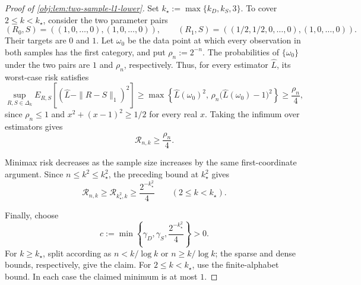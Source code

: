 \begin{proof}[Proof of \cref{obj:lem:two-sample-l1-lower}]
Set \(k_\star:=\max\{k_D,k_S,3\}\). To cover \(2\leq k<k_\star\), consider the two parameter pairs
\[
(R_0,S)=((1,0,\ldots,0),(1,0,\ldots,0)),
\qquad
(R_1,S)=((1/2,1/2,0,\ldots,0),(1,0,\ldots,0)).
\]
Their targets are \(0\) and \(1\). Let \(\omega_0\) be the data point at which every observation in both samples has the first category, and put \(\rho_n:=2^{-n}\). The probabilities of \(\{\omega_0\}\) under the two pairs are \(1\) and \(\rho_n\), respectively. Thus, for every estimator \(\widehat L\), its worst-case risk satisfies
\[
\sup_{R,S\in\Delta_k}E_{R,S}\!\left[(\widehat L-\|R-S\|_1)^2\right]
\geq
\max\!\left\{\widehat L(\omega_0)^2,\,
\rho_n\bigl(\widehat L(\omega_0)-1\bigr)^2\right\}
\geq \frac{\rho_n}{4},
\]
since \(\rho_n\leq1\) and \(x^2+(x-1)^2\geq1/2\) for every real \(x\). Taking the infimum over estimators gives
\[
\mathcal R_{n,k}\geq\frac{\rho_n}{4}.
\] %

Minimax risk decreases as the sample size increases by the same first-coordinate argument. Since \(n\leq k^2\leq k_\star^2\), the preceding bound at \(k_\star^2\) gives
\[
\mathcal R_{n,k}\geq
\mathcal R_{k_\star^2,k}\geq
\frac{2^{-k_\star^2}}4
\qquad(2\leq k<k_\star).
\] %

Finally, choose
\[
c:=\min\left\{\gamma_D,\gamma_S,\frac{2^{-k_\star^2}}4\right\}>0.
\]
For \(k\geq k_\star\), split according as \(n<k/\log k\) or \(n\geq k/\log k\); the sparse and dense bounds, respectively, give the claim. For \(2\leq k<k_\star\), use the finite-alphabet bound. In each case the claimed minimum is at most \(1\). %
\end{proof}

